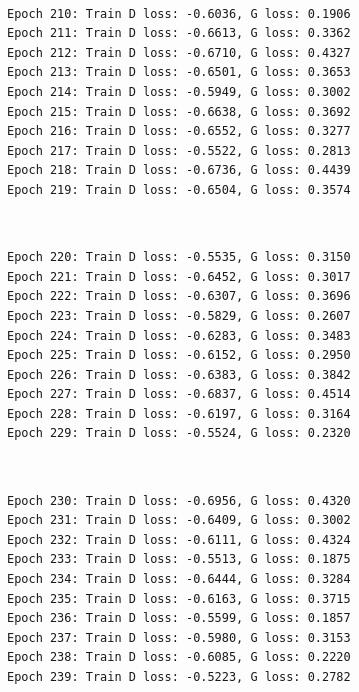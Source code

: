 \documentclass[11pt]{article}
\begin{document}
    \begin{center}
    \end{center}
    { \hspace*{\fill} \\}
    
    \begin{Verbatim}[commandchars=\\\{\}]
Epoch 210: Train D loss: -0.6036, G loss: 0.1906
Epoch 211: Train D loss: -0.6613, G loss: 0.3362
Epoch 212: Train D loss: -0.6710, G loss: 0.4327
Epoch 213: Train D loss: -0.6501, G loss: 0.3653
Epoch 214: Train D loss: -0.5949, G loss: 0.3002
Epoch 215: Train D loss: -0.6638, G loss: 0.3692
Epoch 216: Train D loss: -0.6552, G loss: 0.3277
Epoch 217: Train D loss: -0.5522, G loss: 0.2813
Epoch 218: Train D loss: -0.6736, G loss: 0.4439
Epoch 219: Train D loss: -0.6504, G loss: 0.3574

    \end{Verbatim}

    \begin{center}
    \end{center}
    { \hspace*{\fill} \\}
    
    \begin{Verbatim}[commandchars=\\\{\}]
Epoch 220: Train D loss: -0.5535, G loss: 0.3150
Epoch 221: Train D loss: -0.6452, G loss: 0.3017
Epoch 222: Train D loss: -0.6307, G loss: 0.3696
Epoch 223: Train D loss: -0.5829, G loss: 0.2607
Epoch 224: Train D loss: -0.6283, G loss: 0.3483
Epoch 225: Train D loss: -0.6152, G loss: 0.2950
Epoch 226: Train D loss: -0.6383, G loss: 0.3842
Epoch 227: Train D loss: -0.6837, G loss: 0.4514
Epoch 228: Train D loss: -0.6197, G loss: 0.3164
Epoch 229: Train D loss: -0.5524, G loss: 0.2320

    \end{Verbatim}

    \begin{center}
    \end{center}
    { \hspace*{\fill} \\}
    
    \begin{Verbatim}[commandchars=\\\{\}]
Epoch 230: Train D loss: -0.6956, G loss: 0.4320
Epoch 231: Train D loss: -0.6409, G loss: 0.3002
Epoch 232: Train D loss: -0.6111, G loss: 0.4324
Epoch 233: Train D loss: -0.5513, G loss: 0.1875
Epoch 234: Train D loss: -0.6444, G loss: 0.3284
Epoch 235: Train D loss: -0.6163, G loss: 0.3715
Epoch 236: Train D loss: -0.5599, G loss: 0.1857
Epoch 237: Train D loss: -0.5980, G loss: 0.3153
Epoch 238: Train D loss: -0.6085, G loss: 0.2220
Epoch 239: Train D loss: -0.5223, G loss: 0.2782

    \end{Verbatim}
\end{document}
